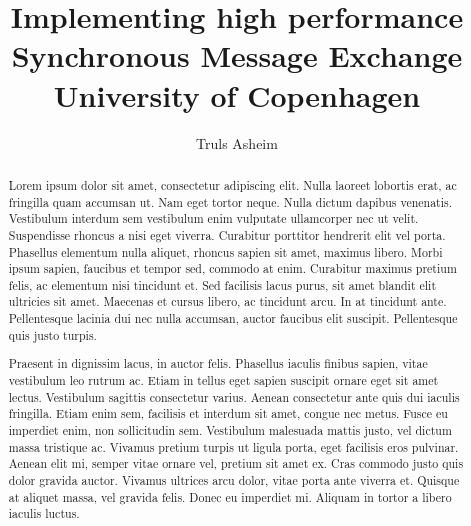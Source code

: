 \documentclass[a4paper]{memoir}
\title{Implementing high performance Synchronous Message Exchange\\
       University of Copenhagen}
\author{Truls Asheim}
\begin{document}
\maketitle


\begin{abstract}
  Lorem ipsum dolor sit amet, consectetur adipiscing elit. Nulla
  laoreet lobortis erat, ac fringilla quam accumsan ut. Nam eget
  tortor neque. Nulla dictum dapibus venenatis. Vestibulum interdum
  sem vestibulum enim vulputate ullamcorper nec ut velit. Suspendisse
  rhoncus a nisi eget viverra. Curabitur porttitor hendrerit elit vel
  porta. Phasellus elementum nulla aliquet, rhoncus sapien sit amet,
  maximus libero. Morbi ipsum sapien, faucibus et tempor sed, commodo
  at enim. Curabitur maximus pretium felis, ac elementum nisi
  tincidunt et. Sed facilisis lacus purus, sit amet blandit elit
  ultricies sit amet. Maecenas et cursus libero, ac tincidunt arcu. In
  at tincidunt ante. Pellentesque lacinia dui nec nulla accumsan,
  auctor faucibus elit suscipit. Pellentesque quis justo turpis.

  Praesent in dignissim lacus, in auctor felis. Phasellus iaculis
  finibus sapien, vitae vestibulum leo rutrum ac. Etiam in tellus eget
  sapien suscipit ornare eget sit amet lectus. Vestibulum sagittis
  consectetur varius. Aenean consectetur ante quis dui iaculis
  fringilla. Etiam enim sem, facilisis et interdum sit amet, congue
  nec metus. Fusce eu imperdiet enim, non sollicitudin sem. Vestibulum
  malesuada mattis justo, vel dictum massa tristique ac. Vivamus
  pretium turpis ut ligula porta, eget facilisis eros pulvinar. Aenean
  elit mi, semper vitae ornare vel, pretium sit amet ex. Cras commodo
  justo quis dolor gravida auctor. Vivamus ultrices arcu dolor, vitae
  porta ante viverra et. Quisque at aliquet massa, vel gravida
  felis. Donec eu imperdiet mi. Aliquam in tortor a libero iaculis
  luctus.
\end{abstract}

\clearpage
\tableofcontents\clearpage
\listoffigures\clearpage
\listoftables







\appendix

\end{document}
